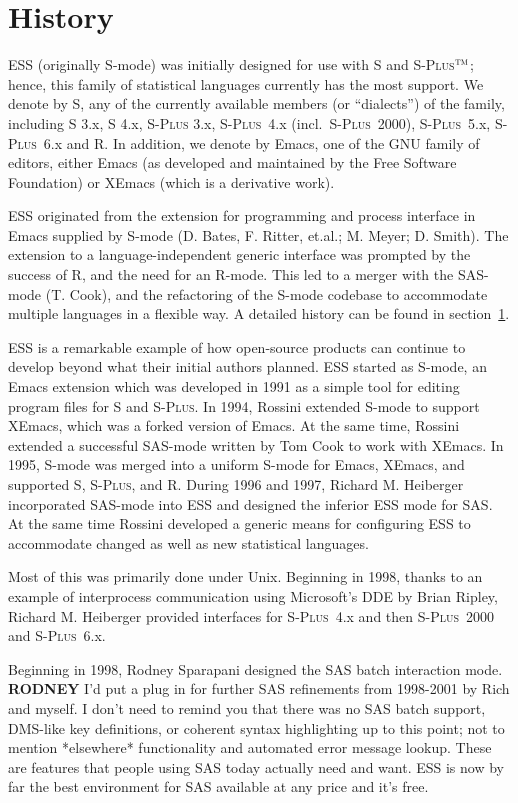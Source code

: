 \documentclass{article}
\newcommand*{\Splus}{\textsc{S-Plus}}
\newcommand{\tm}{$^{\mbox{\scriptsize\sc tm}}$}
\begin{document}
\section{History}
\label{sec:history}

ESS (originally S-mode) was initially designed for use with S and
\Splus\tm; hence, this family of statistical languages currently has
the most support.  We denote by S, any of the currently available
members (or ``dialects'') of the family, including S 3.x, S 4.x, \Splus
3.x, \Splus~4.x (incl.\ \Splus~2000), \Splus~5.x, \Splus~6.x and R.
In addition, we
denote by Emacs, one of the GNU family of editors, either Emacs (as
developed and maintained by the Free Software Foundation) or XEmacs (which
is a derivative work).

ESS originated from the extension for programming and process
interface in Emacs supplied by S-mode (D. Bates, F. Ritter, et.al.; 
M. Meyer; D. Smith).  The extension to a language-independent generic
interface was prompted by the success of R, and the need for an
R-mode.  This led to a merger with the SAS-mode (T. Cook), and the
refactoring of the S-mode codebase to accommodate multiple languages
in a flexible way.  A detailed history can be found in
section~\ref{sec:history}.

ESS is a remarkable example of how open-source products can continue
to develop beyond what their initial authors planned.  ESS started as
S-mode, an Emacs extension which was developed in 1991 as a simple
tool for editing program files for S and \Splus.  In 1994, Rossini
extended S-mode to support XEmacs, which was a forked version of
Emacs.  At the same time, Rossini extended a successful SAS-mode
written by Tom Cook to work with XEmacs.  In 1995, S-mode was merged
into a uniform S-mode for Emacs, XEmacs, and supported S, \Splus, and
R. During 1996 and 1997, Richard M. Heiberger incorporated 
SAS-mode into ESS and designed the inferior ESS mode for SAS.
At the same time Rossini developed a
generic means for configuring ESS to accommodate changed as well as
new statistical languages.

Most of this was primarily done under Unix.  Beginning in 1998, thanks
to an example of interprocess communication using Microsoft's DDE by
Brian Ripley, Richard M. Heiberger provided interfaces for \Splus~4.x
and then \Splus~2000 and \Splus~6.x.  

Beginning in 1998, Rodney Sparapani designed the SAS batch interaction
mode.  \textbf{RODNEY} I'd put a plug in for further SAS refinements
from 1998-2001 by Rich and myself.  I don't need to remind you that
there was no SAS batch support, DMS-like key definitions, or coherent
syntax highlighting up to this point; not to mention *elsewhere*
functionality and automated error message lookup.  These are features
that people using SAS today actually need and want.  ESS is now by far
the best environment for SAS available at any price and it's free.
\end{document}
